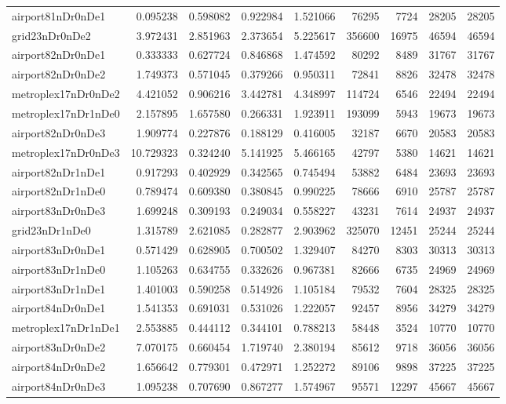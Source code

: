 \documentclass[../../../thesis.tex]{subfiles}
\begin{document}
\begin{longtable}{|l|r|r|r|r|r|r|r|r|}
airport81nDr0nDe1 & 0.095238 & 0.598082 & 0.922984 & 1.521066 & 76295 & 7724 & 28205 & 28205 \\
grid23nDr0nDe2 & 3.972431 & 2.851963 & 2.373654 & 5.225617 & 356600 & 16975 & 46594 & 46594 \\
airport82nDr0nDe1 & 0.333333 & 0.627724 & 0.846868 & 1.474592 & 80292 & 8489 & 31767 & 31767 \\
airport82nDr0nDe2 & 1.749373 & 0.571045 & 0.379266 & 0.950311 & 72841 & 8826 & 32478 & 32478 \\
metroplex17nDr0nDe2 & 4.421052 & 0.906216 & 3.442781 & 4.348997 & 114724 & 6546 & 22494 & 22494 \\
metroplex17nDr1nDe0 & 2.157895 & 1.657580 & 0.266331 & 1.923911 & 193099 & 5943 & 19673 & 19673 \\
airport82nDr0nDe3 & 1.909774 & 0.227876 & 0.188129 & 0.416005 & 32187 & 6670 & 20583 & 20583 \\
metroplex17nDr0nDe3 & 10.729323 & 0.324240 & 5.141925 & 5.466165 & 42797 & 5380 & 14621 & 14621 \\
airport82nDr1nDe1 & 0.917293 & 0.402929 & 0.342565 & 0.745494 & 53882 & 6484 & 23693 & 23693 \\
airport82nDr1nDe0 & 0.789474 & 0.609380 & 0.380845 & 0.990225 & 78666 & 6910 & 25787 & 25787 \\
airport83nDr0nDe3 & 1.699248 & 0.309193 & 0.249034 & 0.558227 & 43231 & 7614 & 24937 & 24937 \\
grid23nDr1nDe0 & 1.315789 & 2.621085 & 0.282877 & 2.903962 & 325070 & 12451 & 25244 & 25244 \\
airport83nDr0nDe1 & 0.571429 & 0.628905 & 0.700502 & 1.329407 & 84270 & 8303 & 30313 & 30313 \\
airport83nDr1nDe0 & 1.105263 & 0.634755 & 0.332626 & 0.967381 & 82666 & 6735 & 24969 & 24969 \\
airport83nDr1nDe1 & 1.401003 & 0.590258 & 0.514926 & 1.105184 & 79532 & 7604 & 28325 & 28325 \\
airport84nDr0nDe1 & 1.541353 & 0.691031 & 0.531026 & 1.222057 & 92457 & 8956 & 34279 & 34279 \\
metroplex17nDr1nDe1 & 2.553885 & 0.444112 & 0.344101 & 0.788213 & 58448 & 3524 & 10770 & 10770 \\
airport83nDr0nDe2 & 7.070175 & 0.660454 & 1.719740 & 2.380194 & 85612 & 9718 & 36056 & 36056 \\
airport84nDr0nDe2 & 1.656642 & 0.779301 & 0.472971 & 1.252272 & 89106 & 9898 & 37225 & 37225 \\
airport84nDr0nDe3 & 1.095238 & 0.707690 & 0.867277 & 1.574967 & 95571 & 12297 & 45667 & 45667 \\

\end{longtable}
\end{document}
